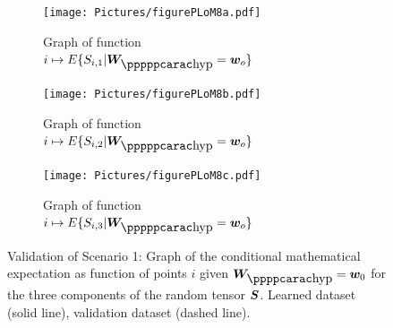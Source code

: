 %
\begin{figure}[!htb]
    \begin{center}
        \begin{subfigure}[b]{0.32\textwidth}
            \begin{center}
                \texttt{[image: Pictures/figurePLoM8a.pdf]}
            \end{center}
                \caption{Graph of function $i\mapsto E\{ S_{i,1} \vert \bfW_\hyppp = \bfw_o \}$}
                \label{fig:figurePLoM8a}
            \end{subfigure}
            \begin{subfigure}[b]{0.32\textwidth}
                \begin{center}
                    \texttt{[image: Pictures/figurePLoM8b.pdf]}
                \end{center}
                \caption{Graph of function $i\mapsto E\{ S_{i,2} \vert \bfW_\hyppp = \bfw_o \}$}
                \label{fig:figurePLoM8b}
            \end{subfigure}
            \begin{subfigure}[b]{0.32\textwidth}
                \begin{center}
                    \texttt{[image: Pictures/figurePLoM8c.pdf]}
                \end{center}    
                \caption{Graph of function $i\mapsto E\{ S_{i,3} \vert \bfW_\hyppp = \bfw_o \}$}
                \label{fig:figurePLoM8c}
            \end{subfigure}
    \end{center}
    \caption[Validation of Scenario 1: Graph of the conditional mathematical expectation as function of points $i$ given $\bfW_\hypp =\bfw_0$.]{Validation of Scenario 1: Graph of the conditional mathematical expectation as function of points $i$ given $\bfW_\hypp =\bfw_0$ for the three components of the random tensor ${\boldsymbol{S}}$.  Learned dataset (solid line), validation dataset (dashed line).}
    \label{fig:figurePLoM8}
\end{figure}
%

